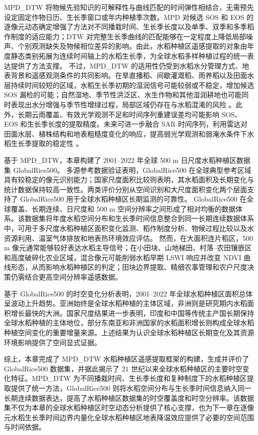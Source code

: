 MPD\_DTW 将物候先验知识的可解释性与曲线匹配的时间弹性相结合，无需预先设定固定作物日历、生长季窗口或年内种植季次数。MPD 对候选 SOS 和 EOS 的逐像元动态确定增强了方法对不同播栽时间、生长季长度以及单季、双季和多季稻作制度的适应能力；DTW 对完整生长季曲线的匹配能够在一定程度上降低局部噪声、个别观测缺失及物候相位差异的影响。由此，水稻种植区遥感提取的对象由年度静态类别拓展为连续时间轴上的水稻生长季，为全球水稻多样种植过程的统一表达提供了方法支撑。
不过，MPD\_DTW 的适用性仍受到水稻水分管理方式、地表背景和遥感观测条件的共同影响。在旱直播稻、间歇灌溉稻、雨养稻以及田面水层持续时间较短的区域，水稻生长季初期的湿润信号可能较弱或不稳定，增加候选 SOS 漏检的可能；自然湿地、季节性洪泛区、水生作物和其他湿润耕地也可能同时表现出水分增强与季节性增绿过程，局部区域仍存在与水稻混淆的风险 \cite{Zhou2016IJAEO,Qiu2015EcoIndic}。此外，长期云雨覆盖、有效光学观测不足和时间序列重建误差均可能影响 SOS、EOS 和生长季长度的提取精度。未来可进一步融合 SAR 时间序列，利用雷达对田面水层、植株结构和地表粗糙度变化的响应，提高弱光学观测和弱淹水条件下水稻生长季提取的稳定性 \cite{Zhan2021,Zhao2024OpticalRadar}。

基于 MPD\_DTW，本章构建了 2001--2022 年全球 500 m 日尺度水稻种植区数据集 GlobalRice500。
多源参考数据验证表明，GlobalRice500 在全球典型参考区域具有较稳定的像元识别能力；国家尺度面积比较则表明，其水稻面积及长期变化与统计数据保持较高一致性。两类评价分别从空间识别和大尺度面积变化两个层面支持了 GlobalRice500 用于全球水稻种植区长期监测的可靠性。
GlobalRice500 在全球覆盖、长期连续、日尺度和 500 m 空间分辨率之间形成了相对均衡的数据体系。该数据集将年度水稻空间分布和生长季时间信息整合到同一长期连续数据体系中，可用于多尺度水稻种植区面积变化监测、稻作制度分析、物候过程比较以及水资源利用、温室气体排放和地表热环境效应评估。
然而，在大面积连片稻区，500 m 像元通常能够较好表达水稻主导信号；在小田块、山地梯田、村落--农田镶嵌区和高度破碎化农业区域，混合像元可能削弱水稻早期 LSWI 响应并改变 NDVI 曲线形态，从而影响水稻种植区的判定；田块边界提取、精细农事管理和农户尺度决策仍需结合更高空间分辨率遥感数据。

基于 GlobalRice500 的时空变化分析表明，2001--2022 年全球水稻种植区面积总体呈波动上升趋势。亚洲始终是全球水稻种植的主体区域，非洲则是研究期内水稻面积增长最快的大洲。国家尺度结果进一步表明，印度和中国等传统主产国长期保持全球水稻种植的主体地位，部分东南亚和非洲国家的水稻面积增长则构成全球水稻种植空间变化的重要增量来源。上述结果为认识全球水稻种植区长期变化及其资源环境影响提供了空间显式证据。

综上，本章完成了 MPD\_DTW 水稻种植区遥感提取框架的构建，生成并评价了 GlobalRice500 数据集，并据此揭示了 21 世纪以来全球水稻种植区的主要时空变化特征。MPD\_DTW 为不同播栽时间、生长季长度和复种制度下的水稻种植区提取提供了统一方法，GlobalRice500 则将水稻空间分布与生长季时间信息纳入同一长期连续数据表达，提高了水稻种植区数据集的时空覆盖度和时空分辨率。该数据集不仅为本章的全球水稻种植区时空动态分析提供了核心支撑，也为下一章在逐像元水稻生长季时间边界内量化全球水稻种植区地表降温效应提供了必要的空间范围与时间依据。

